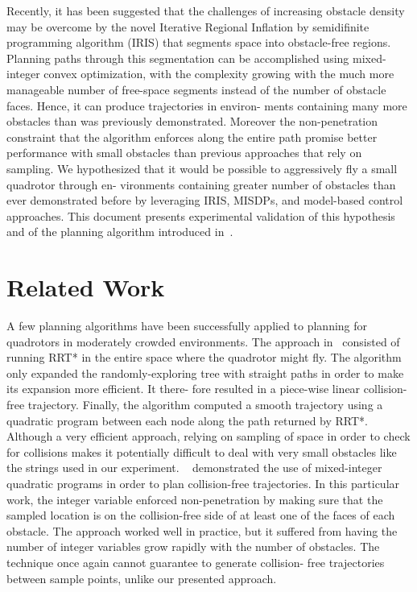 Recently, it has been suggested that the challenges of
increasing obstacle density may be overcome by the novel
Iterative Regional Inflation by semidifinite programming
algorithm (IRIS) that segments space into obstacle-free
regions. Planning paths through this segmentation can be
accomplished using mixed-integer convex optimization, with
the complexity growing with the much more manageable
number of free-space segments instead of the number of
obstacle faces. Hence, it can produce trajectories in environ-
ments containing many more obstacles than was previously
demonstrated. Moreover the non-penetration constraint that
the algorithm enforces along the entire path promise better
performance with small obstacles than previous approaches
that rely on sampling. We hypothesized that it would be
possible to aggressively fly a small quadrotor through en-
vironments containing greater number of obstacles than
ever demonstrated before by leveraging IRIS, MISDPs, and model-based control approaches. This document presents experimental validation of this hypothesis and of the planning algorithm introduced in~\cite{deits2015efficient}. 

\section{Related Work}

A few planning algorithms have been successfully applied to planning for quadrotors in moderately crowded environments. The approach in~\cite{richter2013polynomial} consisted of running RRT* in the
entire space where the quadrotor might fly. The algorithm
only expanded the randomly-exploring tree with straight
paths in order to make its expansion more efficient. It there-
fore resulted in a piece-wise linear collision-free trajectory.
Finally, the algorithm computed a smooth trajectory using a
quadratic program between each node along the path returned
by RRT*. Although a very efficient approach, relying on
sampling of space in order to check for collisions makes it
potentially difficult to deal with very small obstacles like
the strings used in our experiment. ~\cite{mellinger2012mixed} demonstrated the use of mixed-integer quadratic programs in order to plan collision-free trajectories. In this particular work, the integer
variable enforced non-penetration by making sure that the
sampled location is on the collision-free side of at least one
of the faces of each obstacle. The approach worked well in
practice, but it suffered from having the number of integer
variables grow rapidly with the number of obstacles. The
technique once again cannot guarantee to generate collision-
free trajectories between sample points, unlike our presented
approach.

